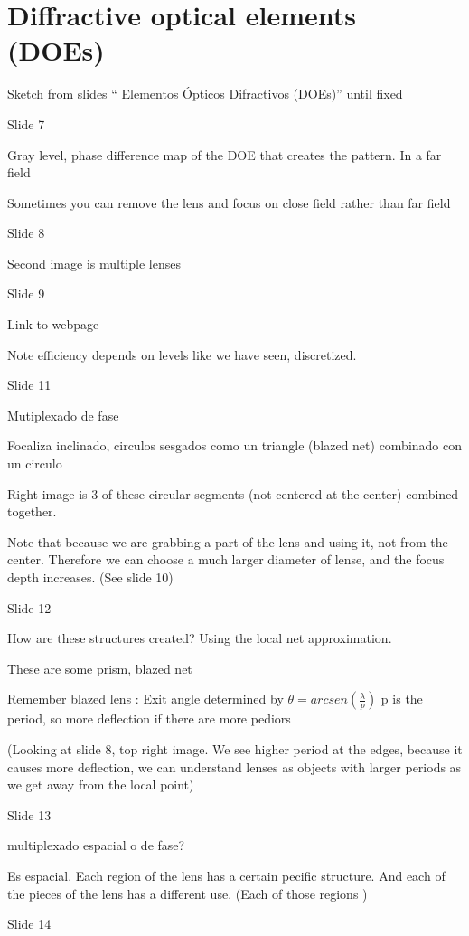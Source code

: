 \documentclass[../main/main.tex]{subfiles}
\begin{document}
\chapter{Diffractive optical elements (DOEs)}

Sketch from slides  `` Elementos Ópticos Difractivos (DOEs)'' until fixed


Slide 7

Gray level, phase difference map of the DOE that creates the pattern. In a far field

Sometimes you can remove the lens and focus on close field rather than far field

Slide 8

Second image is multiple lenses

Slide 9

Link to webpage

Note efficiency depends on levels like we have seen, discretized.


Slide 11


Mutiplexado de fase

Focaliza inclinado, circulos sesgados como un triangle (blazed net) combinado con un circulo

Right image is 3 of these circular segments (not centered at the center) combined together.

Note that because we are grabbing a part of the lens and using it, not from the center. Therefore we can choose a much larger diameter of lense, and the focus depth increases. (See slide 10)


Slide 12

How are these structures created? Using the local net approximation.

These are some prism,  blazed net

Remember blazed lens : Exit angle determined by $\theta = arcsen (\frac \lambda p)$ p is the period, so more deflection if there are more pediors

(Looking at slide 8, top right image. We see higher period at the edges, because it causes more deflection, we can understand lenses as objects with larger periods as we get away from the local point)

Slide 13

multiplexado espacial o de fase?

Es espacial. Each region of the lens has a certain pecific structure. And each of the pieces of the lens has a different use. (Each of those regions )

Slide 14
\end{document}
